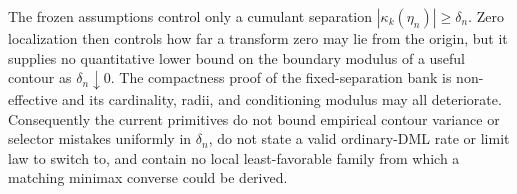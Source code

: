 The frozen assumptions control only a cumulant separation \(|\kappa_k(\eta_n)|\ge\delta_n\). Zero localization then controls how far a transform zero may lie from the origin, but it supplies no quantitative lower bound on the boundary modulus of a useful contour as \(\delta_n\downarrow0\). The compactness proof of the fixed-separation bank is non-effective and its cardinality, radii, and conditioning modulus may all deteriorate. Consequently the current primitives do not bound empirical contour variance or selector mistakes uniformly in \(\delta_n\), do not state a valid ordinary-DML rate or limit law to switch to, and contain no local least-favorable family from which a matching minimax converse could be derived.